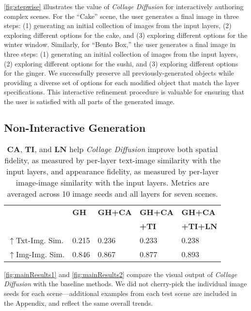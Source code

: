 \cref{fig:stepwise} illustrates the value of \emph{Collage Diffusion} for interactively authoring complex scenes.
For the ``Cake'' scene, the user generates a final image in three steps: (1) generating an initial collection of images from the input layers, (2) exploring different options for the cake, and (3) exploring different options for the winter window. 
Similarly, for ``Bento Box,'' the user generates a final image in three steps: (1) generating an initial collection of images from the input layers, (2) exploring different options for the sushi, and (3) exploring different options for the ginger. 
We successfully preserve all previously-generated objects while providing a diverse set of options for each modified object that match the layer specifications. 
This interactive refinement procedure is valuable for ensuring that the user is satisfied with all parts of the generated image.
\vspace{-0.5em}
\subsection{Non-Interactive Generation} \label{exp:mainResults}
\vspace{-0.5em}
\begin{table}[]
    \begin{tabular}{l|llll}
              & \textbf{GH} & \textbf{GH+CA} & \textbf{GH+CA} & \textbf{GH+CA} \\ 
              & & & \textbf{+TI} & \textbf{+TI+LN} \\
    \hline
    $\uparrow$Txt-Img. Sim.& 0.215 & 0.236 & 0.233 & 0.238 \\
    $\uparrow$Img-Img. Sim.& 0.846 & 0.867 & 0.877 & 0.893 \\
    \end{tabular}
    \caption{\textbf{CA}, \textbf{TI}, and \textbf{LN} help \textit{Collage Diffusion} improve both spatial fidelity, as measured by per-layer text-image similarity with the input layers, and appearance fidelity, as measured by per-layer image-image similarity with the input layers. Metrics are averaged across 10 image seeds and all layers for seven scenes.}
    \label{table:clip}
\end{table}
\cref{fig:mainResults1} and \ref{fig:mainResults2} compare the visual output of \textit{Collage Diffusion} with the baseline methods. 
We did not cherry-pick the individual image seeds for each scene---additional examples from each test scene are included in the Appendix, and reflect the same overall trends. 
\vspace{-1em}
